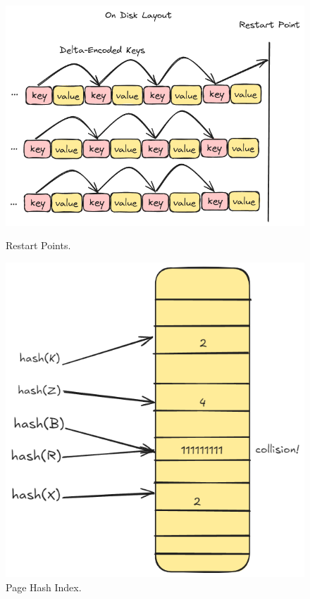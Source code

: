 \documentclass[10pt]{article}
\begin{document}
\begin{figure}[htbp]
  \centering
  \begin{minipage}{0.48\textwidth}
    \centering
    \includegraphics[width=\textwidth]{restart_points.png}
    \caption{Restart Points.}\label{fig:Restart Points}
  \end{minipage}
  \hfill
  \begin{minipage}{0.48\textwidth}
    \centering
    \includegraphics[width=\textwidth, height=0.33\textheight]{page_hash_index.png}
    \caption{Page Hash Index.}\label{fig:Page Hash Index}
  \end{minipage}
\end{figure}
\end{document}
